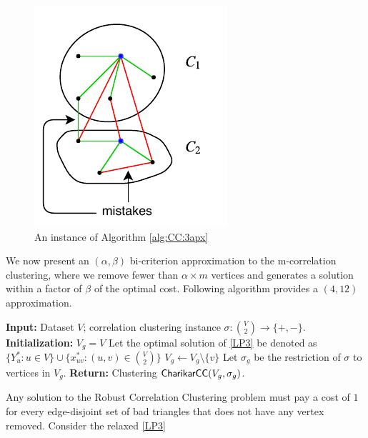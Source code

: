 \begin{figure}[H]
\centering
\includegraphics{./img/3apx.pdf}
\caption{An instance of Algorithm \ref{alg:CC:3apx}}
\label{fig:5}
\end{figure}




We now present an $(\alpha, \beta)$ bi-criterion approximation to the m-correlation clustering, where we remove fewer than $\alpha \times m$ vertices and generates a solution within a factor of $\beta$ of the optimal cost. Following algorithm provides a $(4,12)$ approximation.

\begin{algorithm}
\caption{${\sf RCC}(V,\sigma,m)$}
\label{alg:RCC}
\begin{algorithmic}[1]
\State \textbf{Input:} Dataset $V$; correlation clustering instance $\sigma : \binom{V}{2} \to \{ +,- \}$.
\State \textbf{Initialization:} $V_{g} = V$ 
\State Let the optimal solution of \ref{LP3} be denoted as $\{ Y_u^* : u \in V\} \cup \{ x_{uv}^* : (u,v) \in \binom{V}{2} \}$
\State $V_{g} \gets V_{g} \setminus \{ v \}$
\EndFor
\State Let $\sigma_g$ be the restriction of $\sigma$ to vertices in $V_g$.
\State \textbf{Return:} Clustering ${\sf CharikarCC} (V_g,\sigma_g)$.
\end{algorithmic}
\end{algorithm}

Any solution to the Robust Correlation Clustering problem must pay a cost of $1$ for every edge-disjoint set of bad triangles that does not have any vertex removed. Consider the relaxed \ref{LP3}


